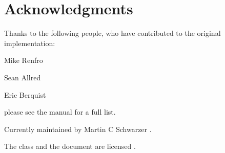 \documentclass[   %
  final,          %
  a4paper,        %
  columns=3,       %
  margin=1.0cm,   %
]{refcard}
\begin{document}
\section{Acknowledgments}

Thanks to the following people, who have contributed to the original implementation:
\begin{refcardinline}
\item[Mike Renfro] %
  \href{https://tex.stackexchange.com/users/3345}{\faStackExchange}
  \href{https://github.com/mikerenfro}{\faGithub}
\item[Sean Allred]
  \href{https://tex.stackexchange.com/users/17423}{\faStackExchange}
  \href{https://github.com/vermiculus}{\faGithub}
\item[Eric Berquist] 
  \href{https://github.com/berquist}{\faGithub}
\item[] please see the manual for a full list.
\end{refcardinline}

Currently maintained by Martin C Schwarzer \href{https://chemistry.stackexchange.com/users/4945}{\faStackExchange}
  \href{https://github.com/polyluxus}{\faGithub}.

The class and the document are licensed \ccbysa.
\end{document}
